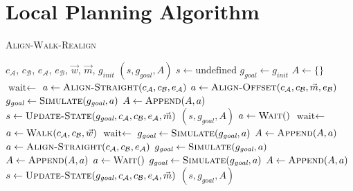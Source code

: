 \section{Local Planning Algorithm}
\label{sec:local_algo}

\begin{algorithm}
	\caption{\scshape Align-Walk-Realign}
	\label{algo:local_algo}
	\begin{algorithmic}[1]
		\REQUIRE $c_\mathcal{A}$, $c_\mathcal{B}$, $e_\mathcal{A}$, $e_\mathcal{B}$, $\vec{w}$, $\vec{m}$, $g_\textit{init}$ 
		\ENSURE $(s, g_\textit{goal}, A)$ 
		\STATE $s \gets \text{undefined}$
		\STATE $g_\textit{goal} \gets g_\textit{init}$
		\STATE $A \gets \{\}$
		\STATE $\text{wait} \gets$ \TRUE
		\LOOP
				\STATE $a \gets \text{\scshape Align-Straight}(c_\mathcal{A}, c_\mathcal{B}, e_\mathcal{A})$
			\ELSE
				\STATE $a \gets \text{\scshape Align-Offset}(c_\mathcal{A}, c_\mathcal{B}, \vec{m}, e_\mathcal{B})$
			\ENDIF
			\STATE $g_\textit{goal} \gets \text{\scshape Simulate}(g_\textit{goal}, a)$
			\STATE $A \gets \text{\scshape Append}(A, a)$
			\STATE $s \gets \text{\scshape Update-State}(g_\textit{goal}, c_\mathcal{A}, c_\mathcal{B}, e_\mathcal{A}, \vec{m})$
				\RETURN $(s, g_\textit{goal}, A)$
			\ENDIF
				\STATE $a \gets \text{\scshape Wait}()$
				\STATE $\text{wait} \gets$ \FALSE
			\ELSE
				\STATE $a \gets \text{\scshape Walk}(c_\mathcal{A}, c_\mathcal{B}, \vec{w})$ 
				\STATE $\text{wait} \gets$ \TRUE
			\ENDIF
			\STATE $g_\textit{goal} \gets \text{\scshape Simulate}(g_\textit{goal}, a)$
			\STATE $A \gets \text{\scshape Append}(A, a)$
				\STATE $a \gets \text{\scshape Align-Straight}(c_\mathcal{A}, c_\mathcal{B}, e_\mathcal{A})$ 
				\STATE $g_\textit{goal} \gets \text{\scshape Simulate}(g_\textit{goal}, a)$
				\STATE $A \gets \text{\scshape Append}(A, a)$
					\STATE $a \gets \text{\scshape Wait}()$
					\STATE $g_\textit{goal} \gets \text{\scshape Simulate}(g_\textit{goal}, a)$
					\STATE $A \gets \text{\scshape Append}(A, a)$
				\ENDWHILE
			\ENDIF
			\STATE $s \gets \text{\scshape Update-State}(g_\textit{goal}, c_\mathcal{A}, c_\mathcal{B}, e_\mathcal{A}, \vec{m})$
				\RETURN $(s, g_\textit{goal}, A)$
			\ENDIF
		\ENDLOOP 
	\end{algorithmic}
\end{algorithm}

